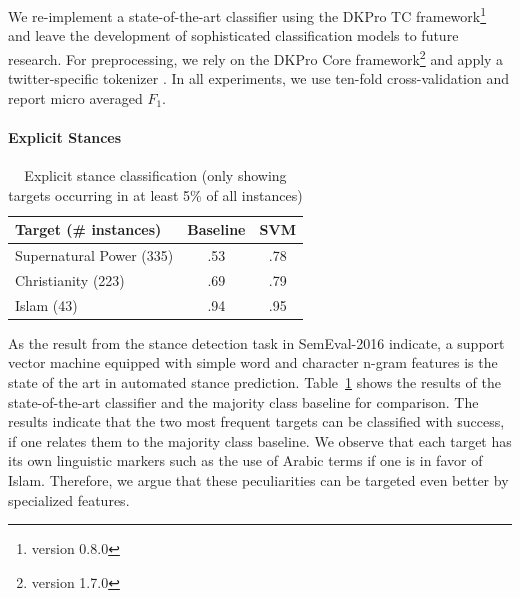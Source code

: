 \documentclass[11pt]{article}
\begin{document}
We re-implement a state-of-the-art classifier \cite{StanceSemEval2016} using the DKPro TC framework\footnote{version 0.8.0} \cite{daxenberger2014dkpro} and leave the development of sophisticated classification models to future research.
For preprocessing, we rely on the DKPro Core framework\footnote{version 1.7.0} \cite{eckartdecastilho-gurevych:2014:OIAF4HLT} and apply a twitter-specific tokenizer \cite{gimpel2011part}.
In all experiments, we use ten-fold cross-validation and report micro averaged $F_1$.

\paragraph{Explicit Stances}

\begin{table}
\small
\centering
\begin{tabular}{lcc}
\toprule
\textbf{Target (\# instances)} & \textbf{Baseline}   & \textbf{SVM}    \\
\midrule
Supernatural Power (335)     & .53 & .78\\
Christianity (223)           & .69 & .79\\
Islam (43)                   & .94 & .95 \\
\bottomrule
\end{tabular}
\caption{Explicit stance classification (only showing targets occurring in at least 5\% of all instances)}
\label{table:classificationExplicitStances}
\end{table}

As the result from the stance detection task in SemEval-2016 \cite{StanceSemEval2016} indicate, a support vector machine equipped with simple word and character n-gram features is the state of the art in automated stance prediction.
Table~\ref{table:classificationExplicitStances} shows the results of the state-of-the-art classifier and the majority class baseline for comparison.
The results indicate that the two most frequent targets can be classified with success, if one relates them to the majority class baseline.
We observe that each target has its own linguistic markers such as the use of Arabic terms if one is in favor of Islam. 
Therefore, we argue that these peculiarities can be targeted even better by specialized features.
\end{document}
